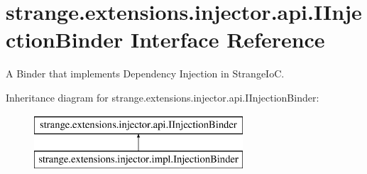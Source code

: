 \hypertarget{interfacestrange_1_1extensions_1_1injector_1_1api_1_1_i_injection_binder}{\section{strange.\-extensions.\-injector.\-api.\-I\-Injection\-Binder Interface Reference}
\label{interfacestrange_1_1extensions_1_1injector_1_1api_1_1_i_injection_binder}
}


A Binder that implements Dependency Injection in Strange\-Io\-C.  


Inheritance diagram for strange.\-extensions.\-injector.\-api.\-I\-Injection\-Binder\-:\begin{figure}[H]
\begin{center}
\leavevmode
\includegraphics[height=2.000000cm]{interfacestrange_1_1extensions_1_1injector_1_1api_1_1_i_injection_binder}
\end{center}
\end{figure}
